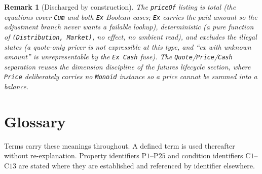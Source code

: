 \documentclass[11pt,a4paper]{article}
\newtheorem{remark}[definition]{Remark}
\begin{document}
\begin{remark}[Discharged by construction]
The \lstinline|priceOf| listing is total (the equations cover \lstinline|Cum| and both \lstinline|Ex| Boolean cases; \lstinline|Ex| carries the paid amount so the adjustment branch never wants a failable lookup), deterministic (a pure function of \lstinline|(Distribution, Market)|, no effect, no ambient read), and excludes the illegal states (a quote-only pricer is not expressible at this type, and ``ex with unknown amount'' is unrepresentable by the \lstinline|Ex Cash| fuse). The \lstinline|Quote|/\lstinline|Price|/\lstinline|Cash| separation reuses the dimension discipline of the futures lifecycle section, where \lstinline|Price| deliberately carries no \lstinline|Monoid| instance so a price cannot be summed into a balance.
\end{remark}

\section{Glossary}
\label{app:glossary}

Terms carry these meanings throughout. A defined term is used thereafter without
re-explanation. Property identifiers $\mathrm{P}1$--$\mathrm{P}25$ and condition
identifiers $\mathrm{C}1$--$\mathrm{C}13$ are stated where they are established and
referenced by identifier elsewhere.
\end{document}
